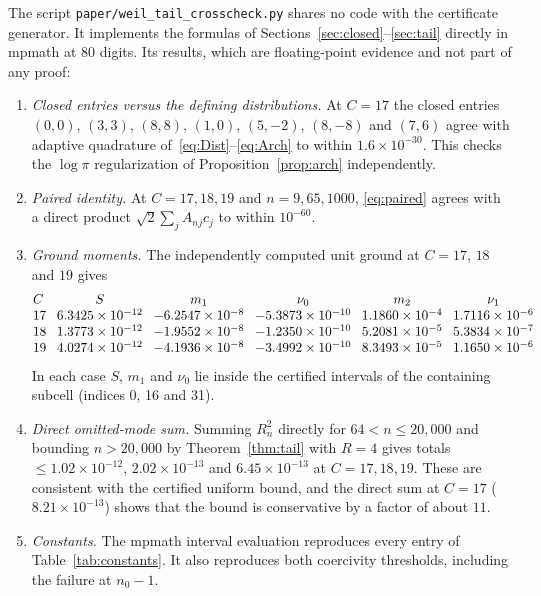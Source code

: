 \documentclass[11pt,a4paper]{article}
\theoremstyle{definition}
\begin{document}
The script \texttt{paper/weil\_tail\_crosscheck.py} shares no code with the
certificate generator. It implements the formulas of
Sections~\ref{sec:closed}--\ref{sec:tail} directly in mpmath at 80 digits.
Its results, which are floating-point evidence and not part of any proof:
\begin{enumerate}
\item \emph{Closed entries versus the defining distributions.} At $C=17$
the closed entries $(0,0)$, $(3,3)$, $(8,8)$, $(1,0)$, $(5,-2)$, $(8,-8)$ and
$(7,6)$ agree with adaptive quadrature of~\eqref{eq:Dist}--\eqref{eq:Arch} to
within $1.6\times10^{-30}$. This checks the $\log\pi$ regularization of
Proposition~\ref{prop:arch} independently.
\item \emph{Paired identity.} At $C=17,18,19$ and $n=9,65,1000$,
\eqref{eq:paired} agrees with a direct product $\sqrt2\sum_jA_{nj}c_j$ to
within $10^{-60}$.
\item \emph{Ground moments.} The independently computed unit ground at
$C=17$, $18$ and $19$ gives
{\small\[
\setlength{\arraycolsep}{4pt}
\begin{array}{@{}lccccc@{}}
C & S & m_1 & \nu_0 & m_2 & \nu_1\\
17 & 6.3425\times10^{-12} & -6.2547\times10^{-8} & -5.3873\times10^{-10} & 1.1860\times10^{-4} & 1.7116\times10^{-6}\\
18 & 1.3773\times10^{-12} & -1.9552\times10^{-8} & -1.2350\times10^{-10} & 5.2081\times10^{-5} & 5.3834\times10^{-7}\\
19 & 4.0274\times10^{-12} & -4.1936\times10^{-8} & -3.4992\times10^{-10} & 8.3493\times10^{-5} & 1.1650\times10^{-6}
\end{array}
\]}
In each case $S$, $m_1$ and $\nu_0$ lie inside the certified intervals of the
containing subcell (indices 0, 16 and 31).
\item \emph{Direct omitted-mode sum.} Summing $R_n^2$ directly for
$64<n\le20{,}000$ and bounding $n>20{,}000$ by Theorem~\ref{thm:tail} with
$R=4$ gives totals $\le1.02\times10^{-12}$, $2.02\times10^{-13}$ and
$6.45\times10^{-13}$ at $C=17,18,19$. These are consistent with the
certified uniform bound, and the direct sum at $C=17$
($8.21\times10^{-13}$) shows that the bound is conservative by a factor of
about $11$.
\item \emph{Constants.} The mpmath interval evaluation reproduces every entry
of Table~\ref{tab:constants}. It also reproduces both coercivity thresholds,
including the failure at $n_0-1$.
\end{enumerate}
\end{document}
